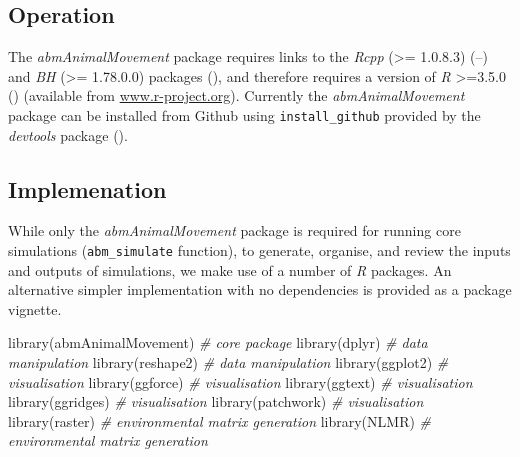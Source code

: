\documentclass[10pt,a4paper]{article}
\newenvironment{Shaded}{}{}
\newcommand{\CommentTok}[1]{\textit{#1}}
\newcommand{\FunctionTok}[1]{#1}
\newcommand{\NormalTok}[1]{#1}
\begin{document}
\subsection{Operation}\label{operation}

The \emph{abmAnimalMovement} package requires links to the \emph{Rcpp} (\textgreater= 1.0.8.3) (--) and \emph{BH} (\textgreater= 1.78.0.0) packages (), and therefore requires a version of \emph{R} \textgreater=3.5.0 () (available from \href{https://www.r-project.org/}{www.r-project.org}).
Currently the \emph{abmAnimalMovement} package can be installed from Github using \texttt{install\_github} provided by the \emph{devtools} package ().

\subsection{Implemenation}\label{implemenation}

While only the \emph{abmAnimalMovement} package is required for running core simulations (\texttt{abm\_simulate} function), to generate, organise, and review the inputs and outputs of simulations, we make use of a number of \emph{R} packages.
An alternative simpler implementation with no dependencies is provided as a package vignette.

\begin{Shaded}
\begin{Highlighting}[]
\FunctionTok{library}\NormalTok{(abmAnimalMovement) }\CommentTok{\# core package}
\FunctionTok{library}\NormalTok{(dplyr) }\CommentTok{\# data manipulation}
\FunctionTok{library}\NormalTok{(reshape2) }\CommentTok{\# data manipulation}
\FunctionTok{library}\NormalTok{(ggplot2) }\CommentTok{\# visualisation}
\FunctionTok{library}\NormalTok{(ggforce) }\CommentTok{\# visualisation}
\FunctionTok{library}\NormalTok{(ggtext) }\CommentTok{\# visualisation}
\FunctionTok{library}\NormalTok{(ggridges) }\CommentTok{\# visualisation}
\FunctionTok{library}\NormalTok{(patchwork) }\CommentTok{\# visualisation}
\FunctionTok{library}\NormalTok{(raster) }\CommentTok{\# environmental matrix generation}
\FunctionTok{library}\NormalTok{(NLMR) }\CommentTok{\# environmental matrix generation}
\end{Highlighting}
\end{Shaded}
\end{document}
